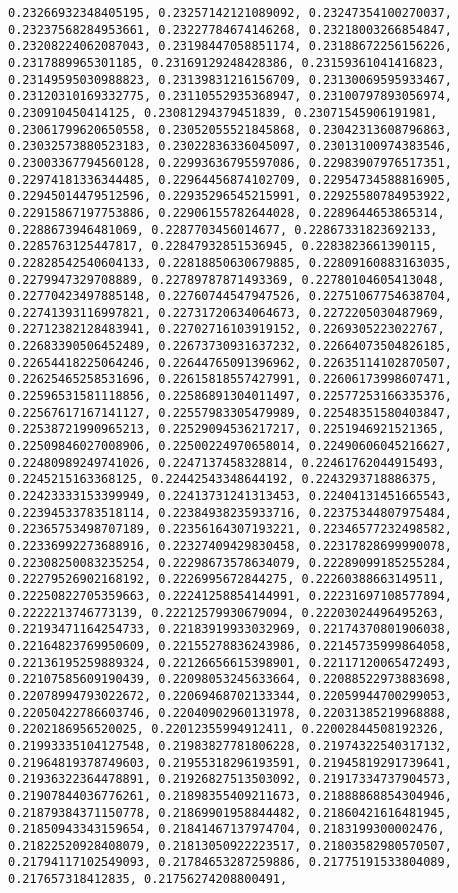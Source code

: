\documentclass[11pt]{article}
\begin{document}
\begin{Verbatim}[commandchars=\\\{\}]
0.23266932348405195, 0.23257142121089092, 0.23247354100270037, 0.23237568284953661, 0.23227784674146268, 0.23218003266854847, 0.23208224062087043, 0.23198447058851174, 0.23188672256156226, 0.2317889965301185, 0.23169129248428386, 0.23159361041416823, 0.23149595030988823, 0.23139831216156709, 0.23130069595933467, 0.23120310169332775, 0.23110552935368947, 0.23100797893056974, 0.230910450414125, 0.23081294379451839, 0.23071545906191981, 0.23061799620650558, 0.23052055521845868, 0.23042313608796863, 0.23032573880523183, 0.23022836336045097, 0.23013100974383546, 0.23003367794560128, 0.22993636795597086, 0.22983907976517351, 0.22974181336344485, 0.22964456874102709, 0.22954734588816905, 0.22945014479512596, 0.22935296545215991, 0.22925580784953922, 0.22915867197753886, 0.22906155782644028, 0.2289644653865314, 0.2288673946481069, 0.2287703456014677, 0.22867331823692133, 0.2285763125447817, 0.22847932851536945, 0.2283823661390115, 0.22828542540604133, 0.22818850630679885, 0.22809160883163035, 0.2279947329708889, 0.22789787871493369, 0.22780104605413048, 0.22770423497885148, 0.22760744547947526, 0.22751067754638704, 0.22741393116997821, 0.22731720634064673, 0.2272205030487969, 0.22712382128483941, 0.22702716103919152, 0.2269305223022767, 0.22683390506452489, 0.22673730931637232, 0.22664073504826185, 0.22654418225064246, 0.22644765091396962, 0.22635114102870507, 0.22625465258531696, 0.22615818557427991, 0.22606173998607471, 0.22596531581118856, 0.22586891304011497, 0.22577253166335376, 0.22567617167141127, 0.22557983305479989, 0.22548351580403847, 0.22538721990965213, 0.22529094536217217, 0.2251946921521365, 0.22509846027008906, 0.22500224970658014, 0.22490606045216627, 0.22480989249741026, 0.2247137458328814, 0.22461762044915493, 0.2245215163368125, 0.22442543348644192, 0.2243293718886375, 0.22423333153399949, 0.22413731241313453, 0.22404131451665543, 0.22394533783518114, 0.22384938235933716, 0.22375344807975484, 0.22365753498707189, 0.22356164307193221, 0.22346577232498582, 0.22336992273688916, 0.22327409429830458, 0.22317828699990078, 0.22308250083235254, 0.22298673578634079, 0.22289099185255284, 0.22279526902168192, 0.2226995672844275, 0.22260388663149511, 0.22250822705359663, 0.22241258854144991, 0.22231697108577894, 0.2222213746773139, 0.22212579930679094, 0.22203024496495263, 0.22193471164254733, 0.22183919933032969, 0.22174370801906038, 0.22164823769950609, 0.22155278836243986, 0.22145735999864058, 0.22136195259889324, 0.22126656615398901, 0.22117120065472493, 0.22107585609190439, 0.22098053245633664, 0.22088522973883698, 0.22078994793022672, 0.22069468702133344, 0.22059944700299053, 0.22050422786603746, 0.22040902960131978, 0.22031385219968888, 0.2202186956520025, 0.22012355994912411, 0.22002844508192326, 0.21993335104127548, 0.21983827781806228, 0.21974322540317132, 0.21964819378749603, 0.21955318296193591, 0.21945819291739641, 0.21936322364478891, 0.21926827513503092, 0.21917334737904573, 0.21907844036776261, 0.21898355409211673, 0.21888868854304946, 0.21879384371150778, 0.21869901958844482, 0.21860421616481945, 0.21850943343159654, 0.21841467137974704, 0.2183199300002476, 0.21822520928408079, 0.21813050922223517, 0.21803582980570507, 0.21794117102549093, 0.21784653287259886, 0.21775191533804089, 0.217657318412835, 0.21756274208800491, 
\end{Verbatim}
\end{document}
